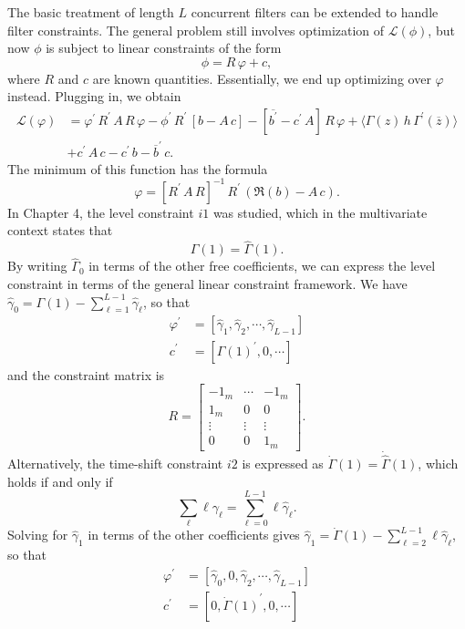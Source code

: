 \documentclass[a4paper]{book}
\begin{document}
The basic treatment of length $L$ concurrent filters can be extended to handle filter constraints.  The general problem still involves optimization of $\mathcal{L} (\phi)$, but now
$\phi$ is subject to linear constraints of the form
\[
   \phi = R \, \varphi + c,
\]
 where $R$ and $c$ are known quantities.  Essentially, we end up optimizing over $\varphi$ instead.  Plugging in, we obtain
\begin{align*}
  \mathcal{L} (\varphi) & = \varphi^{\prime} \, R^{\prime} \, A \, R \, \varphi - \phi^{\prime} \,  R^{\prime} \, [ b - A \, c ] 
 - [ \overline{b^{\prime}} - c^{\prime} \, A ] \, R \, \varphi + \langle \Gamma (z) \, h \, \Gamma^{\prime} (\overline{z}) \rangle \\
  & + c^{\prime} \, A \, c - c^{\prime} \, b - \overline{b}^{\prime} \, c.
\end{align*}
 The minimum of this function has the formula
\[
 \varphi = {[ R^{\prime} \, A \, R ]}^{-1} \, R^{\prime} \, \left( \Re (b) - A \, c \right).
\]
In Chapter 4, the level constraint $i1$ was studied, which in the multivariate context states that
\[
  \Gamma (1) = \widehat{\Gamma} (1).
\]
 By writing $\widehat{\Gamma}_0$ in terms of the other free coefficients, we can express the level constraint in terms of the general linear constraint framework.  We have
 $\widehat{\gamma}_0 = \Gamma (1) - \sum_{\ell=1}^{L-1} \widehat{\gamma}_{\ell}$, so that
\begin{align*}
 \varphi^{\prime} & = [ \widehat{\gamma}_1, \widehat{\gamma}_2, \cdots, \widehat{\gamma}_{L-1} ] \\
 c^{\prime} & = [ { \Gamma (1) }^{\prime}, 0, \cdots ] 
\end{align*}
 and the constraint matrix is
\[
 R  = \left[ \begin{array}{lll} -1_m & \cdots & -1_m \\ 1_m & 0 & 0 \\ \vdots & \vdots & \vdots \\ 0 & 0 & 1_m \end{array} \right].
\]
 Alternatively, the time-shift constraint $i2$ is expressed as $\dot{\Gamma} (1) = \dot{\widehat{\Gamma}} (1)$, which holds if and only if
\[
   \sum_{\ell} \ell \gamma_{\ell} = \sum_{\ell =0}^{L-1} \ell \widehat{\gamma}_{\ell}.
\]
 Solving for $\widehat{\gamma}_1$ in terms of the other coefficients gives $\widehat{\gamma}_1 = \dot{\Gamma} (1) - \sum_{\ell=2}^{L-1} \ell \widehat{\gamma}_{\ell}$, 
so that
\begin{align*}
 \varphi^{\prime} & = [ \widehat{\gamma}_0, 0, \widehat{\gamma}_2, \cdots, \widehat{\gamma}_{L-1} ] \\
 c^{\prime} & = [ 0, { \dot{\Gamma} (1) }^{\prime}, 0, \cdots ] 
\end{align*}
\end{document}
